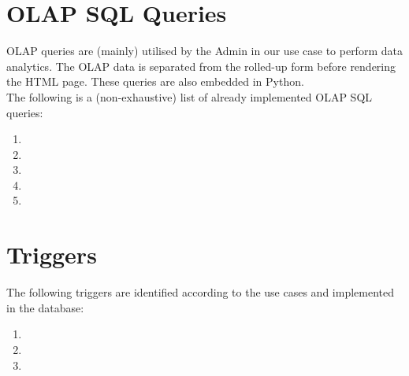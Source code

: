 \section*{\Huge OLAP SQL Queries}
\vspace*{10pt}

OLAP queries are (mainly) utilised by the Admin in our use case to perform data analytics.
The OLAP data is separated from the rolled-up form before rendering the HTML page. These queries are also embedded in Python.
\vspace*{10pt} \\
The following is a (non-exhaustive) list of already implemented OLAP SQL queries:

\begin{enumerate}
    \item 
    \item 
    \item 
    \item 
    \item 
\end{enumerate}

\section*{\Huge Triggers}

The following triggers are identified according to the use cases and implemented in the database:

\begin{enumerate}
    \item 
    \item 
    \item 
\end{enumerate}

\vfill \pagebreak
